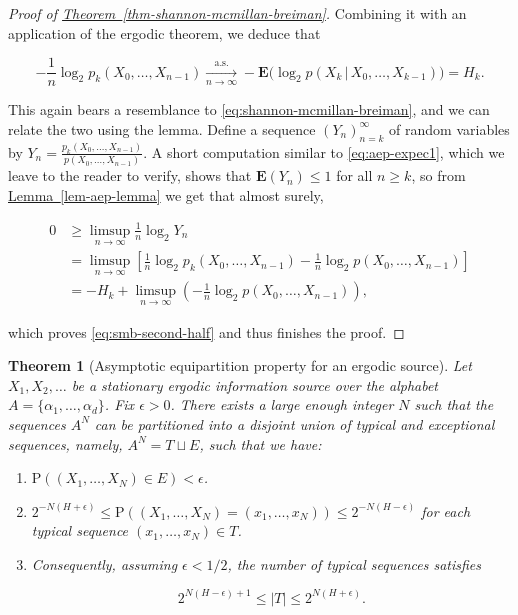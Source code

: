 \documentclass[11pt]{report}
\theoremstyle{plain}
\newtheorem{thm}{Theorem}[chapter]
\theoremstyle{definition}
\begin{document}
\begin{proof}[Proof of \texorpdfstring{\hyperref[thm-shannon-mcmillan-breiman]{Theorem~\ref*{thm-shannon-mcmillan-breiman}}}{Theorem}]
\noindent Combining it with an application of the ergodic
theorem, we deduce that

\[
-\frac{1}{n} \log_2 p_k(X_0,\ldots,X_{n-1}) \xrightarrow[n\to\infty]{\textrm{a.s.}} -\mathbf{E} \big(\log_2 p(X_k\,|\,X_0,\ldots,X_{k-1})\big) = H_k.
\]

\noindent This again bears a resemblance to
\eqref{eq:shannon-mcmillan-breiman}, and we can relate the
two using the lemma. Define a sequence
$(Y_n)_{n=k}^\infty$ of random variables by
$Y_n =
\frac{p_k(X_0,\ldots,X_{n-1})}{p(X_0,\ldots,X_{n-1})}$.
A short computation similar to \eqref{eq:aep-expec1},
which we leave to the reader to verify, shows that
$\mathbf{E}(Y_n) \le 1$ for all $n\ge k$, so from
\hyperref[lem-aep-lemma]{Lemma~\ref*{lem-aep-lemma}} we get that almost surely,

\begin{align*}
0 &\ge \limsup_{n\to\infty} \frac{1}{n} \log_2 Y_n \\
&= \limsup_{n\to\infty} \left[
\frac{1}{n} \log_2 p_k(X_0,\ldots,X_{n-1}) - \frac{1}{n}\log_2 p(X_0,\ldots,X_{n-1}) \right] \\
&=
-H_k + \limsup_{n\to\infty} \left(- \frac{1}{n}\log_2 p(X_0,\ldots,X_{n-1}) \right),
\end{align*}

\noindent which proves \eqref{eq:smb-second-half} and thus finishes
the proof.
\end{proof}

\begin{thm}[Asymptotic equipartition property for an ergodic source]
Let $X_1,X_2,\ldots$ be a stationary ergodic
information source over the alphabet
$A=\{\alpha_1,\ldots,\alpha_d\}$. Fix $\epsilon>0$.
There exists a large enough integer $N$ such that the
sequences $A^N$ can be partitioned into a disjoint
union of typical and exceptional sequences, namely,
$A^N = T \sqcup E$, such that we have:

\begin{enumerate}[label=\arabic*.]
\item $\mathrm{P}((X_1,\ldots,X_N) \in E) < \epsilon$.

\item $2^{-N\left(H + \epsilon\right)} \le
\mathrm{P}((X_1,\ldots,X_N)=(x_1,\ldots,x_N)) \le
2^{-N\left(H - \epsilon\right)}$
for each typical sequence $(x_1,\ldots,x_N)\in T$.

\item Consequently, assuming $\epsilon<1/2$, the number of
typical sequences satisfies

\[
2^{N (H-\epsilon)+1} \le |T| \le 2^{N (H+\epsilon)}.
\]
\end{enumerate}

\end{thm}
\end{document}
